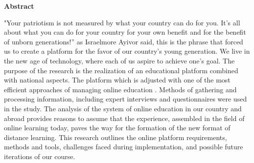 \newpage
\pagestyle{plain}

{
\begin{center}
    \Large
    \textbf{Abstract}
\end{center}
\par "Your patriotism is not measured by what your country can do for you. It's all about what you can do for your country for your own benefit and for the benefit of unborn generations!” as Israelmore Ayivor said, this is the phrase that forced us to create a platform for the favor of our country's young generation. We live in the new age of technology, where each of us aspire to achieve one's goal. The purpose of the research is the realization of an educational platform combined with national aspects. The platform which is adjusted  with one of the most efficient approaches of managing online education \cite{song2004improving}. Methods of gathering and processing information, including expert interviews and questionnaires were used in the study. The analysis of the system of online education in our country and abroad provides reasons to assume that the experience, assembled in the field of online learning today, paves the way for the formation of the new  format of distance learning.\cite{khan2011let}
This research outlines the online platform requirements, methods and tools, challenges faced during implementation, and possible future iterations of our course.
}

